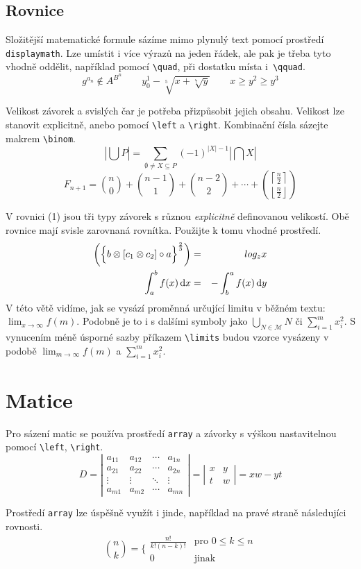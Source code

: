 \documentclass[11pt, a4paper, twocolumn]{article}
\begin{document}
\vfill\eject %

\subsection{Rovnice}
Složitější matematické formule sázíme mimo plynulý
text pomocí prostředí \texttt{displaymath}. Lze umístit i více
výrazů na jeden řádek, ale pak je třeba tyto vhodně
oddělit, například pomocí \verb|\quad|, při dostatku místa i~\verb|\qquad|.
$$g^{a_n} \notin A^{B^n}\qquad y^1_0 - \sqrt[5]{x + \sqrt[7]{y}}\qquad x \ge y^2 \geq y^3$$

Velikost závorek a svislých čar je potřeba přizpůsobit jejich obsahu. Velikost lze stanovit explicitně, anebo pomocí \verb|\left| a \verb|\right|. Kombinační čísla sázejte makrem \verb|\binom|.
$$\left| \bigcup P \right| = \sum\limits _{\emptyset \neq X\subseteq P} (-1)^{\left|X\right|-1}\left|\bigcap X\right|$$\bigskip
$$F_{n+1}=\binom{n}{0} + \binom{n-1}{1} + \binom{n-2}{2} + \cdots + \binom{\left\lceil \frac{n}{2} \right\rceil}{\left\lfloor \frac{n}{2} \right\rfloor}$$

V rovnici (1) jsou tři typy závorek s různou \emph{explicitně} definovanou velikostí. Obě rovnice mají svisle zarovnaná rovnítka. Použijte k tomu vhodné prostředí.
\setcounter{equation}{0}
\begin{eqnarray}
\biggl(\Bigl\{b\otimes [c_1 \otimes c_2] \circ a\Bigl\}^{\frac{2}{3}}\biggr) & = & log_zx \\
\label{rovnica2}\int_{a}^{b} f(x)\,\mathrm{d}x & = & -\int_{b}^{a}f(x)\,\mathrm{d}y
\end{eqnarray}
V této větě vidíme, jak se vysází proměnná určující limitu v běžném textu: $\lim_{x\rightarrow\infty}f(m)$. Podobně je to i s dalšími symboly jako $\bigcup_{N\in \mathcal{M}}N$ či $\sum_{i=1}^{m}x_{i}^{2}$. S vynucením méně úsporné sazby příkazem \verb|\limits| budou vzorce vysázeny v podobě $\displaystyle{\lim_{m\rightarrow\infty}f(m)}$ a $\sum\limits_{i=1}^{m}x_{i}^{2}$.

\section{Matice}
Pro sázení matic se používa prostředí \texttt{array} a závorky s výškou nastavitelnou pomocí \verb|\left|, \verb|\right|.
\[
D=
 \left| 
\begin{array}{cccc}
     a_{11} & a_{12} & \cdots & a_{1n}\\
     a_{21} & a_{22} & \cdots & a_{2n}\\
     \vdots & \vdots & \ddots & \vdots\\
     a_{m1} & a_{m2} & \cdots & a_{mn} 
\end{array}
\right|
=
\left|
\begin{array}{cc}
    x & y\\
    t & w
\end{array}
\right|
= xw - yt
\]

Prostředí \texttt{array} lze úspěšně využít i jinde, například na pravé straně následujíci rovnosti.
\[
\binom{n}{k} = 
\Biggl\{
\begin{array}{ll}
    \frac{n!}{k!(n-k)!} & \text{pro }0 \leq k \leq n\\
    0 & \text{jinak}
\end{array}
\]
\end{document}
